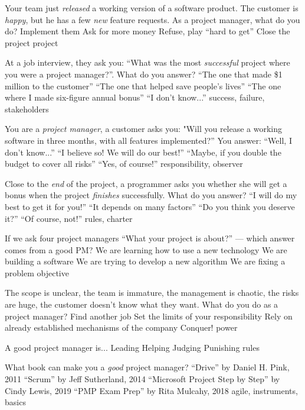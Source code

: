 \documentclass{article}
\begin{document}

\pmbaQuestion
  {Your team just \emph{released} a working version of a software product. The customer is \emph{happy}, but he has a few \emph{new} feature requests. As a project manager, what do you do?}
  {Implement them}
  {Ask for more money}
  {Refuse, play ``hard to get''}
  {Close the project}
  {project}

\pmbaQuestion
  {At a job interview, they ask you: ``What was the most \emph{successful} project where you were a project manager?''. What do you answer?}
  {``The one that made \$1 million to the customer''}
  {``The one that helped save people's lives''}
  {``The one where I made six-figure annual bonus''}
  {``I don't know...''}
  {success, failure, stakeholders}

\pmbaQuestion
  {You are a \emph{project manager}, a customer asks you: "Will you release a working software in three months, with all features implemented?'' You answer:}
  {``Well, I don't know...''}
  {``I believe so! We will do our best!''}
  {``Maybe, if you double the budget to cover all risks''}
  {``Yes, of course!''}
  {responsibility, observer}

\pmbaQuestion
  {Close to the \emph{end} of the project, a programmer asks you whether she will get a bonus when the project \emph{finishes} successfully. What do you answer?}
  {``I will do my best to get it for you!''}
  {``It depends on many factors''}
  {``Do you think you deserve it?''}
  {``Of course, not!''}
  {rules, charter}

\pmbaQuestion
  {If we ask four project managers ``What your project is about?'' --- which answer comes from a good PM?}
  {We are learning how to use a new technology}
  {We are building a software}
  {We are trying to develop a new algorithm}
  {We are fixing a problem}
  {objective}

\pmbaQuestion
  {The scope is unclear, the team is immature, the management is chaotic, the risks are huge, the customer doesn't know what they want. What do you do as a project manager?}
  {Find another job}
  {Set the limits of your responsibility}
  {Rely on already established mechanisms of the company}
  {Conquer!}
  {power}

\pmbaQuestion
  {A good project manager is...}
  {Leading}
  {Helping}
  {Judging}
  {Punishing}
  {rules}

\pmbaQuestion
  {What book can make you a \emph{good} project manager?}
  {``Drive'' by Daniel H. Pink, 2011}
  {``Scrum'' by Jeff Sutherland, 2014}
  {``Microsoft Project Step by Step'' by Cindy Lewis, 2019}
  {``PMP Exam Prep'' by Rita Mulcahy, 2018}
  {agile, instruments, basics}
\end{document}
